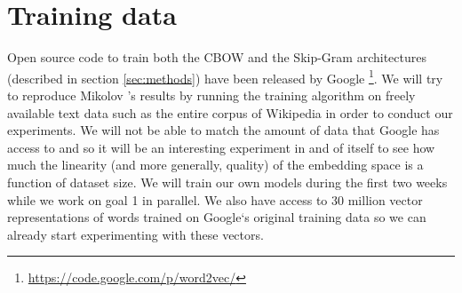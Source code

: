 \section{Training data}\label{sec:train_data}

Open source code to train both the CBOW and the Skip-Gram architectures (described in section \ref{sec:methods}) have been released by Google \footnote{\url{https://code.google.com/p/word2vec/}}. 
We will try to reproduce Mikolov \etal 's results by running the training algorithm on freely available text data such as the entire corpus of Wikipedia in order to conduct our experiments. 
We will not be able to match the amount of data that Google has access to and so it will be an interesting experiment in and of itself to see how much the linearity (and more generally, quality) of the embedding space is a function of dataset size. 
We will train our own models during the first two weeks while we work on goal 1 in parallel.  
We also have access to 30 million vector representations of words trained on Google`s original training data so we can already start experimenting with these vectors. 

